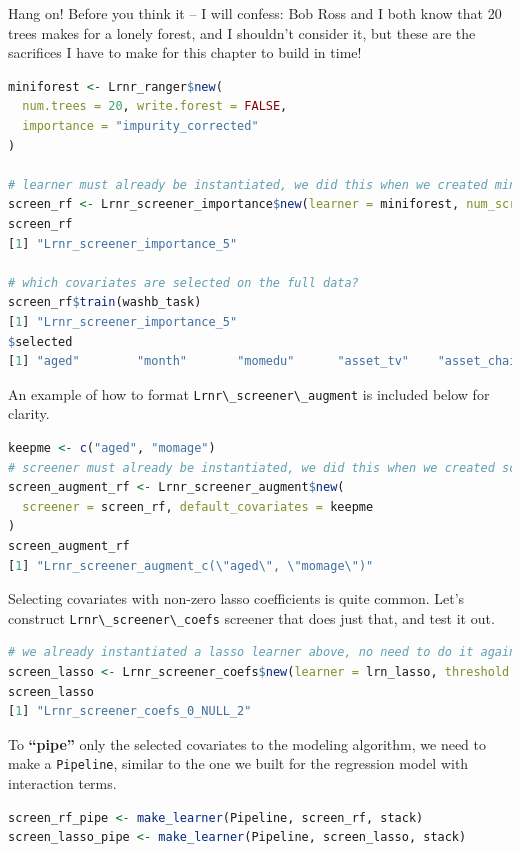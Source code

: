 \documentclass[12pt, krantz2,]{krantz}
\newcommand{\passthrough}[1]{#1}
\theoremstyle{definition}
\theoremstyle{definition}
\theoremstyle{definition}
\newcommand{\1}{\mathbbm{1}}
\begin{document}
Hang on! Before you think it -- I will confess: Bob Ross and I both know that 20
trees makes for a lonely forest, and I shouldn't consider it, but these are the
sacrifices I have to make for this chapter to build in time!

\begin{lstlisting}[language=R]
miniforest <- Lrnr_ranger$new(
  num.trees = 20, write.forest = FALSE,
  importance = "impurity_corrected"
)

# learner must already be instantiated, we did this when we created miniforest
screen_rf <- Lrnr_screener_importance$new(learner = miniforest, num_screen = 5)
screen_rf
[1] "Lrnr_screener_importance_5"

# which covariates are selected on the full data?
screen_rf$train(washb_task)
[1] "Lrnr_screener_importance_5"
$selected
[1] "aged"        "month"       "momedu"      "asset_tv"    "asset_chair"
\end{lstlisting}

An example of how to format \passthrough{\lstinline!Lrnr\_screener\_augment!} is included below for
clarity.

\begin{lstlisting}[language=R]
keepme <- c("aged", "momage")
# screener must already be instantiated, we did this when we created screen_rf
screen_augment_rf <- Lrnr_screener_augment$new(
  screener = screen_rf, default_covariates = keepme
)
screen_augment_rf
[1] "Lrnr_screener_augment_c(\"aged\", \"momage\")"
\end{lstlisting}

Selecting covariates with non-zero lasso coefficients is quite common. Let's
construct \passthrough{\lstinline!Lrnr\_screener\_coefs!} screener that does just that, and test it out.

\begin{lstlisting}[language=R]
# we already instantiated a lasso learner above, no need to do it again
screen_lasso <- Lrnr_screener_coefs$new(learner = lrn_lasso, threshold = 0)
screen_lasso
[1] "Lrnr_screener_coefs_0_NULL_2"
\end{lstlisting}

To \textbf{``pipe''} only the selected covariates to the modeling algorithm, we need to
make a \passthrough{\lstinline!Pipeline!}, similar to the one we built for the regression model with
interaction terms.

\begin{lstlisting}[language=R]
screen_rf_pipe <- make_learner(Pipeline, screen_rf, stack)
screen_lasso_pipe <- make_learner(Pipeline, screen_lasso, stack)
\end{lstlisting}
\end{document}
